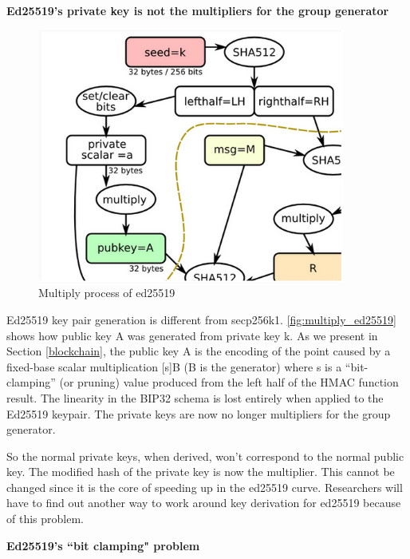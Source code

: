 \begin{adjustwidth}{1cm}{}
    \bigskip
    {\textbf{Ed25519's private key is not the multipliers for the group generator}}

    \bigskip
    \begin{figure}[ht!]
        \centering
        \includegraphics[width=0.9\textwidth]{images/ed25519_generator_multiplier.png}
        \caption[Multiply process of ed25519]{Multiply process of ed25519}
        \label{fig:multiply_ed25519}
    \end{figure}

    Ed25519 key pair generation is different from secp256k1. \autoref{fig:multiply_ed25519} shows how public key A was generated from private key k. As we present in Section \ref{blockchain}, the public key A is the encoding of the point caused by a fixed-base scalar multiplication [s]B (B is the generator) where s is a “bit-clamping” (or pruning) value produced from the left half of the HMAC function result. The linearity in the BIP32 schema is lost entirely when applied to the Ed25519 keypair. The private keys are now no longer multipliers for the group generator.

    So the normal private keys, when derived, won’t correspond to the normal public key. The modified hash of the private key is now the multiplier. This cannot be changed since it is the core of speeding up in the ed25519 curve. Researchers will have to find out another way to work around key derivation for ed25519 because of this problem.

    \bigskip
    {\textbf{Ed25519's “bit clamping" problem}}


\end{adjustwidth}
